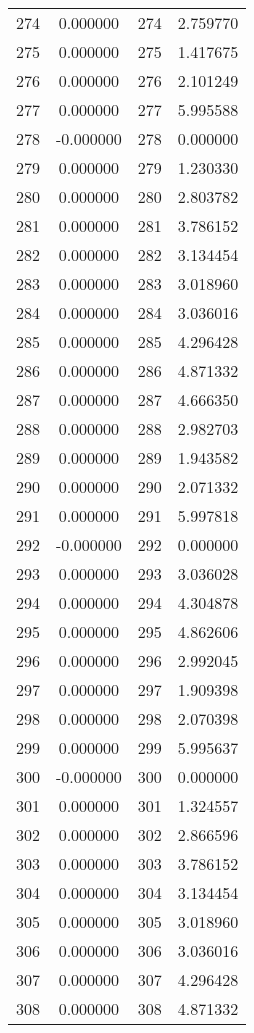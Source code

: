 \documentclass[12pt]{article}
\begin{document}
\begin{longtable}{@{}cccc@{}}
274 & 0.000000 & 274 & 2.759770 \\
275 & 0.000000 & 275 & 1.417675 \\
276 & 0.000000 & 276 & 2.101249 \\
277 & 0.000000 & 277 & 5.995588 \\
278 & -0.000000 & 278 & 0.000000 \\
279 & 0.000000 & 279 & 1.230330 \\
280 & 0.000000 & 280 & 2.803782 \\
281 & 0.000000 & 281 & 3.786152 \\
282 & 0.000000 & 282 & 3.134454 \\
283 & 0.000000 & 283 & 3.018960 \\
284 & 0.000000 & 284 & 3.036016 \\
285 & 0.000000 & 285 & 4.296428 \\
286 & 0.000000 & 286 & 4.871332 \\
287 & 0.000000 & 287 & 4.666350 \\
288 & 0.000000 & 288 & 2.982703 \\
289 & 0.000000 & 289 & 1.943582 \\
290 & 0.000000 & 290 & 2.071332 \\
291 & 0.000000 & 291 & 5.997818 \\
292 & -0.000000 & 292 & 0.000000 \\
293 & 0.000000 & 293 & 3.036028 \\
294 & 0.000000 & 294 & 4.304878 \\
295 & 0.000000 & 295 & 4.862606 \\
296 & 0.000000 & 296 & 2.992045 \\
297 & 0.000000 & 297 & 1.909398 \\
298 & 0.000000 & 298 & 2.070398 \\
299 & 0.000000 & 299 & 5.995637 \\
300 & -0.000000 & 300 & 0.000000 \\
301 & 0.000000 & 301 & 1.324557 \\
302 & 0.000000 & 302 & 2.866596 \\
303 & 0.000000 & 303 & 3.786152 \\
304 & 0.000000 & 304 & 3.134454 \\
305 & 0.000000 & 305 & 3.018960 \\
306 & 0.000000 & 306 & 3.036016 \\
307 & 0.000000 & 307 & 4.296428 \\
308 & 0.000000 & 308 & 4.871332 \\

\end{longtable}
\end{document}
